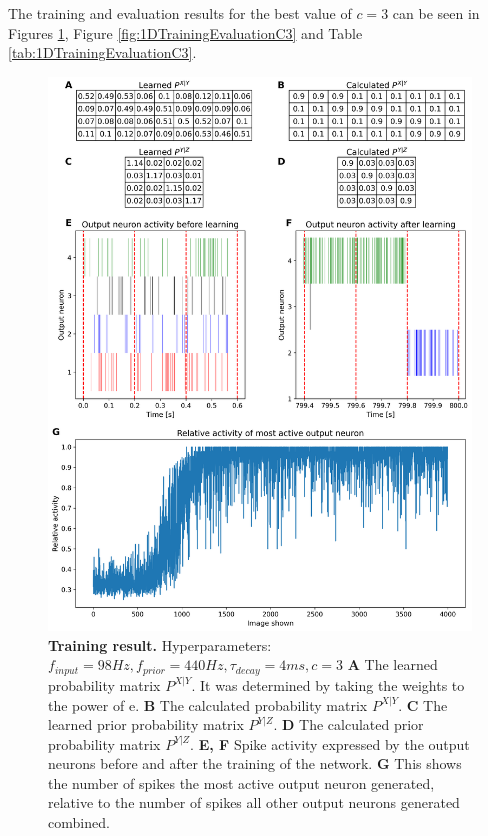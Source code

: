 The training and evaluation results for the best value of $c = 3$ can be seen in Figures \ref{fig:1DTrainingC3}, Figure \ref{fig:1DTrainingEvaluationC3} and Table \ref{tab:1DTrainingEvaluationC3}.
\begin{figure}
  \includegraphics[width=0.8\linewidth]{figures/1D/training/trainingPlot_98_440_4_c3.png}
  \caption{\textbf{Training result.} Hyperparameters: $f_{input} = 98 Hz, f_{prior} = 440 Hz, \tau_{decay} = 4 ms, c = 3$  \textbf{A} The learned probability matrix $P^{X|Y}$. It was determined by taking the weights to the power of e. \textbf{B} The calculated probability matrix $P^{X|Y}$. \textbf{C} The learned prior probability matrix $P^{Y|Z}$. \textbf{D} The calculated prior probability matrix $P^{Y|Z}$.
 \textbf{E, F} Spike activity expressed by the output neurons before and after the training of the network. \textbf{G} This shows the number of spikes the most active output neuron generated, relative to the number of spikes all other output neurons generated combined.}
  \label{fig:1DTrainingC3}
\end{figure}

